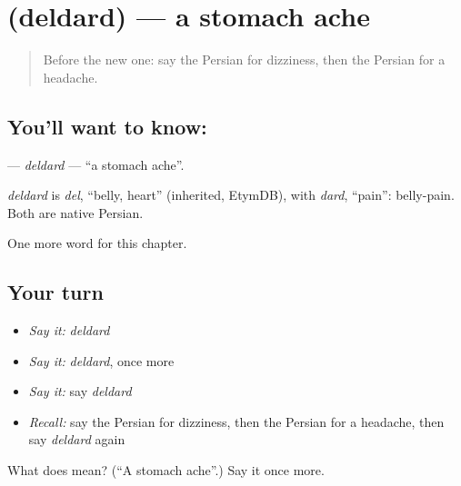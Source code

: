 \section[\texorpdfstring{\fa{دل} \fa{درد} (deldard)}{دل درد (deldard)}]{  (deldard) — a stomach ache}

\label{lesson:FA-C263-deldard}



\begin{quote}
Before the new one: say the Persian for dizziness, then the Persian for a headache.
\end{quote}

\subsection*{You'll want to know:  }
\textbf{ } — \emph{deldard} — \textquotedblleft{}a stomach ache\textquotedblright{}.

\begin{cousinweb}
\emph{deldard} is \emph{del}, \textquotedblleft{}belly, heart\textquotedblright{} (inherited, EtymDB), with \emph{dard}, \textquotedblleft{}pain\textquotedblright{}: belly-pain. Both are native Persian.
\end{cousinweb}

\begin{grammarlens}[title={What you've built}]
One more word for this chapter.
\end{grammarlens}

\subsection*{Your turn}
\begin{itemize}
\raggedright
  \item \emph{Say it:} \emph{deldard}
  \item \emph{Say it:} \emph{deldard}, once more
  \item \emph{Say it:} say \emph{deldard}
  \item \emph{Recall:} say the Persian for dizziness, then the Persian for a headache, then say \emph{deldard} again
\end{itemize}

\begin{tcolorbox}[breakable,colback=teal!4,colframe=teal!35!black,title={Before you move on}]
What does   mean? (\textquotedblleft{}A stomach ache\textquotedblright{}.) Say it once more.
\end{tcolorbox}
